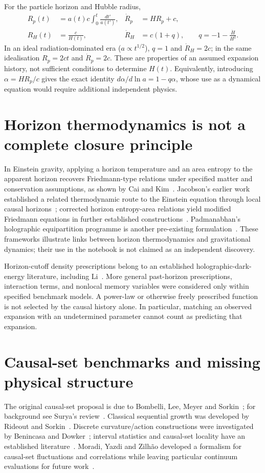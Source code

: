 \documentclass[11pt,a4paper]{article}
\begin{document}
For the particle horizon and Hubble radius,
\begin{align}
R_p(t)&=a(t)c\int_0^t\frac{dt'}{a(t')}, & \dot R_p&=HR_p+c,\\
R_H(t)&=\frac{c}{H(t)}, &\dot R_H&=c(1+q), \qquad q=-1-\frac{\dot H}{H^2}.
\end{align}
In an ideal radiation-dominated era ($a\propto t^{1/2}$), $q=1$ and $\dot R_H=2c$; in the same idealisation $R_p=2ct$ and $\dot R_p=2c$. These are properties of an assumed expansion history, not sufficient conditions to determine $H(t)$. Equivalently, introducing $\alpha=HR_p/c$ gives the exact identity $d\alpha/d\ln a=1-q\alpha$, whose use as a dynamical equation would require additional independent physics.

\section{Horizon thermodynamics is not a complete closure principle}
In Einstein gravity, applying a horizon temperature and an area entropy to the apparent horizon recovers Friedmann-type relations under specified matter and conservation assumptions, as shown by Cai and Kim~\cite{CaiKim2005}. Jacobson's earlier work established a related thermodynamic route to the Einstein equation through local causal horizons~\cite{Jacobson1995}; corrected horizon entropy-area relations yield modified Friedmann equations in further established constructions~\cite{CaiCaoHu2008}. Padmanabhan's holographic equipartition programme is another pre-existing formulation~\cite{Padmanabhan2012}. These frameworks illustrate links between horizon thermodynamics and gravitational dynamics; their use in the notebook is not claimed as an independent discovery.

Horizon-cutoff density prescriptions belong to an established holographic-dark-energy literature, including Li~\cite{Li2004}. More general past-horizon prescriptions, interaction terms, and nonlocal memory variables were considered only within specified benchmark models. A power-law or otherwise freely prescribed function is not selected by the causal history alone. In particular, matching an observed expansion with an undetermined parameter cannot count as predicting that expansion.

\section{Causal-set benchmarks and missing physical structure}
The original causal-set proposal is due to Bombelli, Lee, Meyer and Sorkin~\cite{BombelliLeeMeyerSorkin1987}; for background see Surya's review~\cite{Surya2019}. Classical sequential growth was developed by Rideout and Sorkin~\cite{RideoutSorkin2000}. Discrete curvature/action constructions were investigated by Benincasa and Dowker~\cite{BenincasaDowker2010}; interval statistics and causal-set locality have an established literature~\cite{GlaserSurya2013}. Moradi, Yazdi and Zilh\~ao developed a formalism for causal-set fluctuations and correlations while leaving particular continuum evaluations for future work~\cite{MoradiYazdiZilhao2025}.
\end{document}
